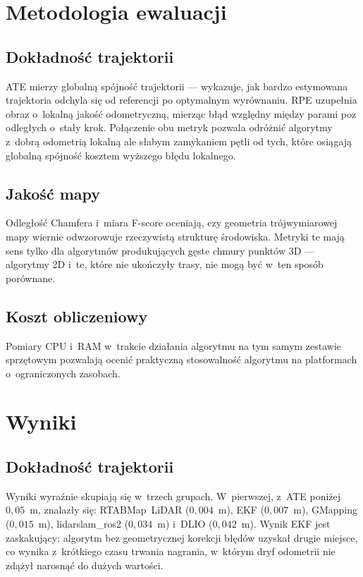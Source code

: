 \section{Metodologia ewaluacji}

\subsection{Dokładność trajektorii}

ATE mierzy globalną spójność trajektorii --- wykazuje, jak bardzo
estymowana trajektoria odchyla się od referencji po optymalnym wyrównaniu.
RPE uzupełnia obraz o~lokalną jakość odometryczną, mierząc błąd względny
między parami poz odległych o~stały krok.
Połączenie obu metryk pozwala odróżnić algorytmy z~dobrą odometrią lokalną
ale słabym zamykaniem pętli od tych, które osiągają globalną spójność kosztem
wyższego błędu lokalnego.

\subsection{Jakość mapy}

Odległość Chamfera i~miara F-score oceniają, czy geometria trójwymiarowej
mapy wiernie odwzorowuje rzeczywistą strukturę środowiska.
Metryki te mają sens tylko dla algorytmów produkujących gęste chmury
punktów 3D --- algorytmy 2D i~te, które nie ukończyły trasy,
nie mogą być w~ten sposób porównane.

\subsection{Koszt obliczeniowy}

Pomiary CPU i~RAM w~trakcie działania algorytmu na tym samym zestawie
sprzętowym pozwalają ocenić praktyczną stosowalność algorytmu
na platformach o~ograniczonych zasobach.

\section{Wyniki}



\subsection{Dokładność trajektorii}



Wyniki wyraźnie skupiają się w~trzech grupach.
W~pierwszej, z~ATE poniżej $0{,}05$~m, znalazły się: RTABMap~LiDAR ($0{,}004$~m),
EKF ($0{,}007$~m), GMapping ($0{,}015$~m), lidarslam\_ros2 ($0{,}034$~m)
i~DLIO ($0{,}042$~m).
Wynik EKF jest zaskakujący: algorytm bez geometrycznej korekcji błędów
uzyskał drugie miejsce, co wynika z~krótkiego czasu trwania nagrania,
w~którym dryf odometrii nie zdążył narosnąć do dużych wartości.

